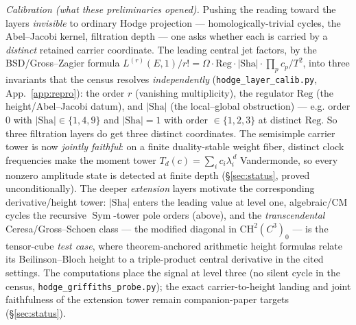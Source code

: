 \documentclass[11pt]{article}
\theoremstyle{definition}
\newcommand{\Sym}{\operatorname{Sym}}
\newcommand{\Sha}{\mathrm{Sha}}
\begin{document}
\emph{Calibration (what these preliminaries opened).} Pushing the reading toward the layers
\emph{invisible} to ordinary Hodge projection --- homologically-trivial cycles, the Abel--Jacobi kernel,
filtration depth --- one asks whether each is carried by a \emph{distinct} retained carrier coordinate.
The leading central jet factors, by the BSD/Gross--Zagier formula
$L^{(r)}(E,1)/r!=\Omega\cdot\mathrm{Reg}\cdot|\Sha|\cdot\prod_p c_p/T^2$, into three invariants that the
census resolves \emph{independently} (\texttt{hodge\_layer\_calib.py}, App.~\ref{app:repro}): the order
$r$ (vanishing multiplicity), the regulator $\mathrm{Reg}$ (the height/Abel--Jacobi datum),
and $|\Sha|$ (the local--global obstruction) --- e.g. order $0$ with $|\Sha|\in\{1,4,9\}$ and
$|\Sha|=1$ with order $\in\{1,2,3\}$ at distinct $\mathrm{Reg}$. So three filtration layers do get three
distinct coordinates. The semisimple carrier tower is now \emph{jointly faithful}: on a finite
duality-stable weight fiber, distinct clock frequencies make the moment tower
$T_d(c)=\sum_i c_i\lambda_i^{\,d}$ Vandermonde, so every nonzero amplitude state is detected at finite
depth (\S\ref{sec:status}, proved unconditionally). The deeper \emph{extension} layers motivate the
corresponding derivative/height tower: $|\Sha|$ enters the leading value at level one, algebraic/CM cycles
the recursive $\Sym$-tower pole orders (above), and the \emph{transcendental} Ceresa/Gross--Schoen class
--- the modified diagonal in $\mathrm{CH}^2(C^3)_0$ --- is the tensor-cube \emph{test case}, where
theorem-anchored arithmetic height formulas relate its Beilinson--Bloch height to a triple-product central
derivative in the cited settings. The computations place the signal at level three (no silent cycle in the
census, \texttt{hodge\_griffiths\_probe.py}); the exact carrier-to-height landing and joint faithfulness of
the extension tower remain companion-paper targets (\S\ref{sec:status}).
\end{document}

